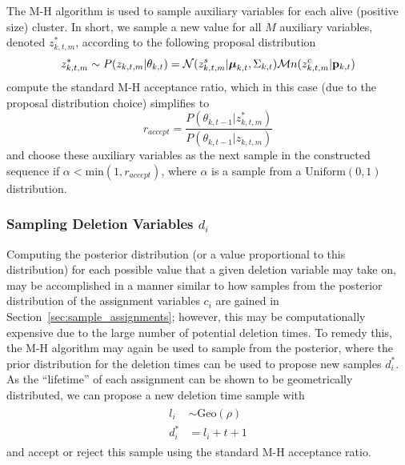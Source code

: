 \documentclass[twocolumn, final]{svjour3}
\begin{document}
The M-H algorithm is used to sample auxiliary variables for each alive (positive size) cluster. In short, we sample a new value for all $M$ auxiliary variables, denoted $z_{k,t,m}^{*}$, according to the following proposal distribution
\begin{equation}
\label{proposal_distro}
z_{k,t,m}^{*}  \sim  P(z_{k,t,m} | \theta_{k,t}) = \mathcal{N}(z_{k,t,m}^{s} | \boldsymbol{\mu}_{k,t}, \Sigma_{k,t}) \mathcal{M}n(z_{k,t,m}^{c} | \bold{p}_{k,t})
\end{equation}
compute the standard M-H acceptance ratio, which in this case (due to the proposal distribution choice) simplifies to 
\begin{equation}
\label{accept_ratio}
r_{accept} = \frac{P(\theta_{k,t-1} | z_{k,t,m}^{*})}{P(\theta_{k,t-1} | z_{k,t,m})}
\end{equation}
and choose these auxiliary variables as the next sample in the constructed sequence if $\alpha < \text{min}(1, r_{accept})$, where $\alpha$ is a sample from a $\text{Uniform}(0,1)$ distribution.






\subsubsection{Sampling Deletion Variables $d_{i}$}
Computing the posterior distribution (or a value proportional to this distribution) for each possible value that a given deletion variable may take on, may be accomplished in a manner similar to how samples from the posterior distribution of the assignment variables $c_{i}$ are gained in Section~\ref{sec:sample_assignments}; however, this may be computationally expensive due to the large number of potential deletion times. To remedy this, the M-H algorithm may again be used to sample from the posterior, where the prior distribution for the deletion times can be used to propose new samples $d_{i}^{*}$. As the ``lifetime'' of each assignment can be shown to be geometrically distributed, we can propose a new deletion time sample with
\begin{align}
\begin{split}
l_{i}  &\sim  \text{Geo}(\rho)  \\
d_{i}^{*}  &= l_{i} + t + 1
\end{split}
\end{align}
and accept or reject this sample using the standard M-H acceptance ratio. 
\end{document}
